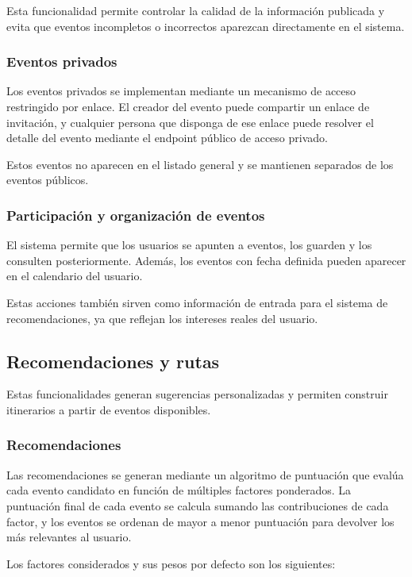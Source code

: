 Esta funcionalidad permite controlar la calidad de la información publicada y evita que eventos incompletos o incorrectos aparezcan directamente en el sistema.

\subsubsection{Eventos privados}

Los eventos privados se implementan mediante un mecanismo de acceso restringido por enlace. El creador del evento puede compartir un enlace de invitación, y cualquier persona que disponga de ese enlace puede resolver el detalle del evento mediante el endpoint público de acceso privado.

Estos eventos no aparecen en el listado general y se mantienen separados de los eventos públicos.

\subsubsection{Participación y organización de eventos}

El sistema permite que los usuarios se apunten a eventos, los guarden y los consulten posteriormente. Además, los eventos con fecha definida pueden aparecer en el calendario del usuario.

Estas acciones también sirven como información de entrada para el sistema de recomendaciones, ya que reflejan los intereses reales del usuario.

\subsection{Recomendaciones y rutas}

Estas funcionalidades generan sugerencias personalizadas y permiten construir itinerarios a partir de eventos disponibles.

\subsubsection{Recomendaciones}

Las recomendaciones se generan mediante un algoritmo de puntuación que evalúa cada evento candidato en función de múltiples factores ponderados. La puntuación final de cada evento se calcula sumando las contribuciones de cada factor, y los eventos se ordenan de mayor a menor puntuación para devolver los más relevantes al usuario.

Los factores considerados y sus pesos por defecto son los siguientes:

